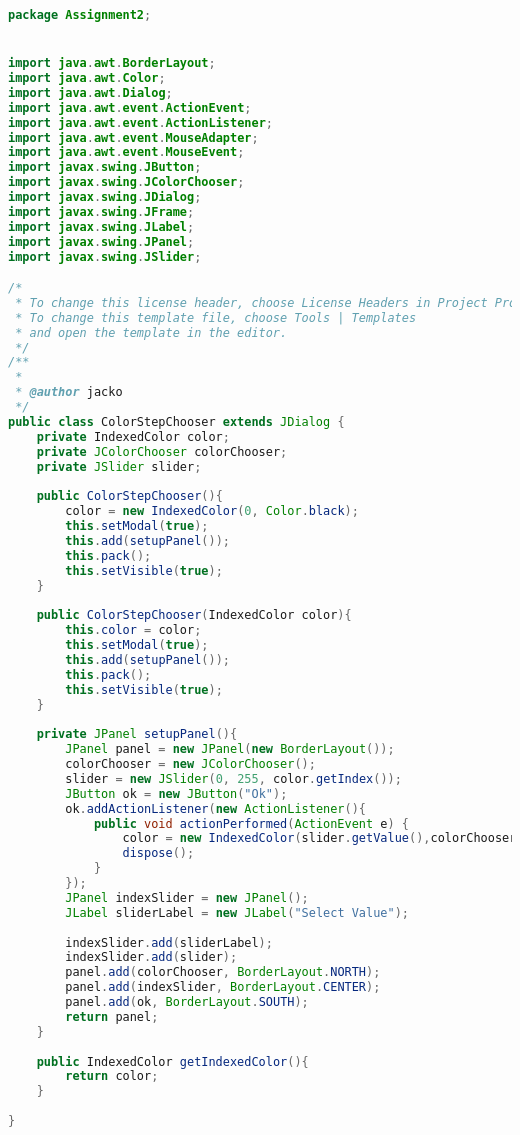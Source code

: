 \documentclass[pdftex,a4paper,10pt,titlepage]{article}
\begin{document}
\begin{lstlisting}[language=java, breaklines=true]
package Assignment2;


import java.awt.BorderLayout;
import java.awt.Color;
import java.awt.Dialog;
import java.awt.event.ActionEvent;
import java.awt.event.ActionListener;
import java.awt.event.MouseAdapter;
import java.awt.event.MouseEvent;
import javax.swing.JButton;
import javax.swing.JColorChooser;
import javax.swing.JDialog;
import javax.swing.JFrame;
import javax.swing.JLabel;
import javax.swing.JPanel;
import javax.swing.JSlider;

/*
 * To change this license header, choose License Headers in Project Properties.
 * To change this template file, choose Tools | Templates
 * and open the template in the editor.
 */
/**
 *
 * @author jacko
 */
public class ColorStepChooser extends JDialog {
    private IndexedColor color;
    private JColorChooser colorChooser;
    private JSlider slider;
    
    public ColorStepChooser(){
        color = new IndexedColor(0, Color.black);
        this.setModal(true);
        this.add(setupPanel());
        this.pack();
        this.setVisible(true);
    }
    
    public ColorStepChooser(IndexedColor color){
        this.color = color;
        this.setModal(true);
        this.add(setupPanel());
        this.pack();
        this.setVisible(true);
    }
   
    private JPanel setupPanel(){
        JPanel panel = new JPanel(new BorderLayout());
        colorChooser = new JColorChooser();
        slider = new JSlider(0, 255, color.getIndex());
        JButton ok = new JButton("Ok");
        ok.addActionListener(new ActionListener(){
            public void actionPerformed(ActionEvent e) {
                color = new IndexedColor(slider.getValue(),colorChooser.getColor());
                dispose();
            } 
        });
        JPanel indexSlider = new JPanel();
        JLabel sliderLabel = new JLabel("Select Value");
        
        indexSlider.add(sliderLabel);
        indexSlider.add(slider);
        panel.add(colorChooser, BorderLayout.NORTH);
        panel.add(indexSlider, BorderLayout.CENTER);
        panel.add(ok, BorderLayout.SOUTH);
        return panel;
    }
    
    public IndexedColor getIndexedColor(){
        return color;
    }
    
}

\end{lstlisting}
\end{document}
